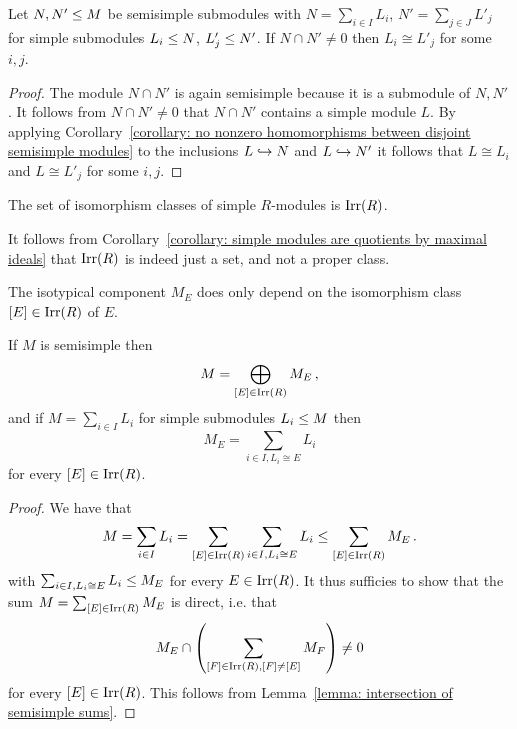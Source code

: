 



\begin{lemma}
  \label{lemma: intersection of semisimple sums}
  Let $N, N' \leq M$ be semisimple submodules with $N = \sum_{i \in I} L_i$, $N' = \sum_{j \in J} L'_j$ for simple submodules $L_i \leq N$, $L'_j \leq N'$.
  If $N \cap N' \neq 0$ then $L_i \cong L'_j$ for some $i, j$.
\end{lemma}


\begin{proof}
  The module $N \cap N'$ is again semisimple because it is a submodule of $N, N'$.
  It follows from $N \cap N' \neq 0$ that $N \cap N'$ contains a simple module $L$.
  By applying Corollary~\ref{corollary: no nonzero homomorphisms between disjoint semisimple modules} to the inclusions $L \hookrightarrow N$ and $L \hookrightarrow N'$ it follows that $L \cong L_i$ and $L \cong L'_j$ for some $i, j$.
\end{proof}


\begin{definition}
  The set of isomorphism classes of simple $R$-modules is $\operatorname{Irr}(R)$.
\end{definition}


\begin{remark}
  It follows from Corollary~\ref{corollary: simple modules are quotients by maximal ideals} that $\operatorname{Irr}(R)$ is indeed just a set, and not a proper class.
\end{remark}


\begin{remark}
  The isotypical component $M_E$ does only depend on the isomorphism class $[E] \in \operatorname{Irr}(R)$ of $E$.
\end{remark}


\begin{theorem}
  \label{theorem: isotypical decomposition}
  If $M$ is semisimple then
  \[
      M
    = \bigoplus_{[E] \in \operatorname{Irr}(R)} M_E \,,
  \]
  and if $M = \sum_{i \in I} L_i$ for simple submodules $L_i \leq M$ then
  \[
      M_E
    = \sum_{i \in I, L_i \cong E} L_i
  \]
  for every $[E] \in \operatorname{Irr}(R)$.
\end{theorem}


\begin{proof}
  We have that
  \[
              M
    =         \sum_{i \in I} L_i
    =         \sum_{[E] \in \operatorname{Irr}(R)} \sum_{i \in I, L_i \cong E} L_i
    \leq \sum_{[E] \in \operatorname{Irr}(R)} M_E \,.
  \]
  with $\sum_{i \in I, L_i \cong E} L_i \leq M_E$ for every $E \in \operatorname{Irr}(R)$.
  It thus sufficies to show that the sum $M  = \sum_{[E] \in \operatorname{Irr}(R)} M_E$ is direct, i.e. that
  \[
          M_E \cap \left( \sum_{[F] \in \operatorname{Irr}(R), [F] \neq [E]} M_F \right)
    \neq  0
  \]
  for every $[E] \in \operatorname{Irr}(R)$.
  This follows from Lemma~\ref{lemma: intersection of semisimple sums}.
\end{proof}


